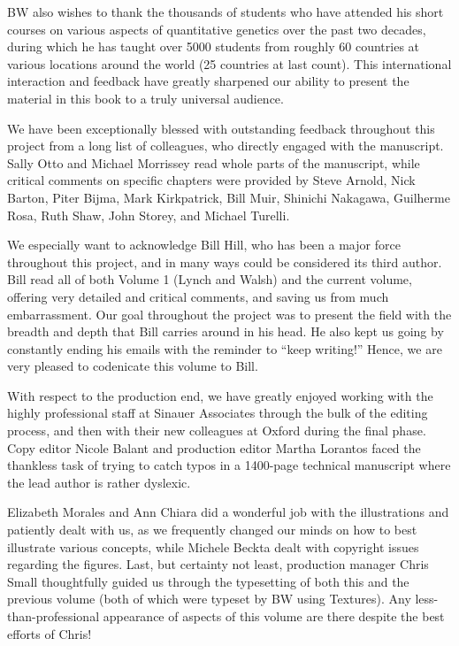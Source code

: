 \documentclass{article}
\begin{document}
BW also wishes to thank the thousands of students who have attended his short courses on various aspects of quantitative genetics over the past two decades, during which he has taught over 5000 students from roughly 60 countries at various locations around the world (25 countries at last count). This international interaction and feedback have greatly sharpened our ability to present the material in this book to a truly universal audience.

We have been exceptionally blessed with outstanding feedback throughout this project from a long list of colleagues, who directly engaged with the manuscript. Sally Otto and Michael Morrissey read whole parts of the manuscript, while critical comments on specific chapters were provided by Steve Arnold, Nick Barton, Piter Bijma, Mark Kirkpatrick, Bill Muir, Shinichi Nakagawa, Guilherme Rosa, Ruth Shaw, John Storey, and Michael Turelli.

We especially want to acknowledge Bill Hill, who has been a major force throughout this project, and in many ways could be considered its third author. Bill read all of both Volume 1 (Lynch and Walsh) and the current volume, offering very detailed and critical comments, and saving us from much embarrassment. Our goal throughout the project was to present the field with the breadth and depth that Bill carries around in his head. He also kept us going by constantly ending his emails with the reminder to “keep writing!” Hence, we are very pleased to codenicate this volume to Bill.

With respect to the production end, we have greatly enjoyed working with the highly professional staff at Sinauer Associates through the bulk of the editing process, and then with their new colleagues at Oxford during the final phase. Copy editor Nicole Balant and production editor Martha Lorantos faced the thankless task of trying to catch typos in a 1400-page technical manuscript where the lead author is rather dyslexic.

Elizabeth Morales and Ann Chiara did a wonderful job with the illustrations and patiently dealt with us, as we frequently changed our minds on how to best illustrate various concepts, while Michele Beckta dealt with copyright issues regarding the figures. Last, but certainty not least, production manager Chris Small thoughtfully guided us through the typesetting of both this and the previous volume (both of which were typeset by BW using Textures). Any less-than-professional appearance of aspects of this volume are there despite the best efforts of Chris!
\end{document}
